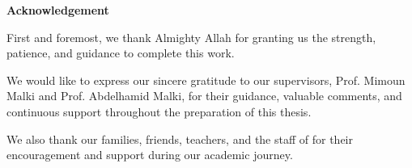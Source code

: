 \vspace*{4cm}
\begin{center}
    {\Huge\bfseries Acknowledgement}
\end{center}
\vskip 1cm

{}

First and foremost, we thank Almighty Allah for granting us the strength, patience, and guidance to complete this work.

We would like to express our sincere gratitude to our supervisors, Prof. Mimoun Malki and Prof. Abdelhamid Malki, for their guidance, valuable comments, and continuous support throughout the preparation of this thesis.

We also thank our families, friends, teachers, and the staff of \institution{} for their encouragement and support during our academic journey.

\clearpage
